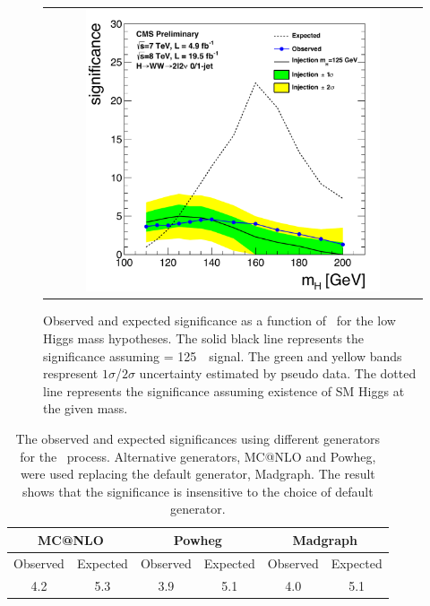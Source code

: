 %
\begin{figure}[htp] 
\centering 
\begin{tabular}{c} 
\includegraphics[width=0.8\textwidth]{figures/signif_allcomb_inj125_data_zoom.pdf} 
\end{tabular} 
\caption{Observed and expected significance as a function of \mHi\ for 
the low Higgs mass hypotheses. 
The solid black line represents the significance assuming \mHi = 125~\GeV\ signal. 
The green and yellow bands respresent $1\sigma$/$2\sigma$ uncertainty 
estimated by pseudo data. The dotted line represents the significance 
assuming existence of SM Higgs at the given mass. 
} 
\label{fig:significane_mH} 
\end{figure} 

%
\begin{table}[htp] 
\begin{center} 
\begin{tabular}{cc|cc|cc} 
\hline 
\multicolumn{2}{c|}{MC@NLO}   &  \multicolumn{2}{c|}{Powheg} & \multicolumn{2}{c}{Madgraph} \\
\hline \hline 
Observed & Expected & Observed & Expected &  Observed & Expected \\ 
\hline 
4.2 & 5.3 & 3.9 & 5.1 & 4.0 & 5.1 \\
\hline 
\end{tabular} 
\caption{The observed and expected significances
using different generators for the \qqww\ process. Alternative generators,
MC@NLO and Powheg, were used replacing the default generator, Madgraph.
The result shows that the significance is insensitive to the choice
of default generator.} 
\label{tab:sig_diffgenerator} 
\end{center} 
\end{table} 


